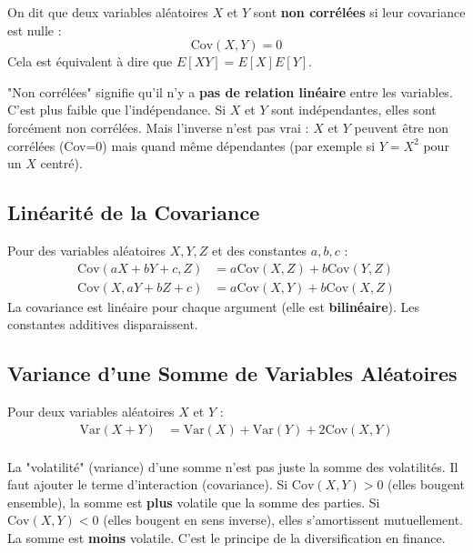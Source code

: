 \begin{definitionbox}
On dit que deux variables aléatoires $X$ et $Y$ sont \textbf{non corrélées} si leur covariance est nulle :
$$ \text{Cov}(X,Y) = 0 $$
Cela est équivalent à dire que $E[XY] = E[X]E[Y]$.
\end{definitionbox}

\begin{intuitionbox}
"Non corrélées" signifie qu'il n'y a \textbf{pas de relation linéaire} entre les variables. C'est plus faible que l'indépendance. Si $X$ et $Y$ sont indépendantes, elles sont forcément non corrélées. Mais l'inverse n'est pas vrai : $X$ et $Y$ peuvent être non corrélées (Cov=0) mais quand même dépendantes (par exemple si $Y=X^2$ pour un $X$ centré).
\end{intuitionbox}

\subsection{Linéarité de la Covariance}

\begin{definitionbox}
Pour des variables aléatoires $X, Y, Z$ et des constantes $a, b, c$ :
\begin{align*}
\text{Cov}(aX + bY + c, Z) &= a\text{Cov}(X, Z) + b\text{Cov}(Y, Z) \\
\text{Cov}(X, aY + bZ + c) &= a\text{Cov}(X, Y) + b\text{Cov}(X, Z)
\end{align*}
La covariance est linéaire pour chaque argument (elle est \textbf{bilinéaire}). Les constantes additives disparaissent.
\end{definitionbox}


\subsection{Variance d'une Somme de Variables Aléatoires}

\begin{theorembox}
Pour deux variables aléatoires $X$ et $Y$ :
\begin{align*}
\text{Var}(X+Y) &= \text{Var}(X) + \text{Var}(Y) + 2\text{Cov}(X,Y) \\
\end{align*}
\end{theorembox}

\begin{intuitionbox}
La "volatilité" (variance) d'une somme n'est pas juste la somme des volatilités. Il faut ajouter le terme d'interaction (covariance).
Si $\text{Cov}(X,Y) > 0$ (elles bougent ensemble), la somme est \textbf{plus} volatile que la somme des parties.
Si $\text{Cov}(X,Y) < 0$ (elles bougent en sens inverse), elles s'amortissent mutuellement. La somme est \textbf{moins} volatile. C'est le principe de la diversification en finance.
\end{intuitionbox}

